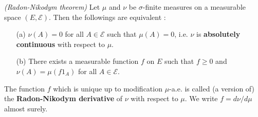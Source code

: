\documentclass[12pt,a4paper]{report}
\begin{document}
 \emph{(Radon-Nikodym theorem)} Let $\mu$ and $\nu$ be $\sigma$-finite measures on a measurable space $(E, \mathscr{E})$. Then the followings are equivalent :
\begin{itemize}
\item[(a)] $\nu(A) =0$ for all $A\in \mathscr{E}$ such that $\mu(A) =0$, i.e. $\nu$ is \textbf{absolutely continuous} with respect to $\mu$.
\item[(b)] There exists a measurable function $f$ on $E$ such that $f\geq 0$ and $\nu(A) = \mu(f 1_A)$ for all $A\in \mathscr{E}$.
\end{itemize}
\s

The function $f$ which is unique up to modification $\mu$-a.e. is called (a version of) the \textbf{Radon-Nikodym derivative} of $\nu$ with respect to $\mu$. We write $f = d\nu /d\mu$ almost surely. 
\s
\end{document}
